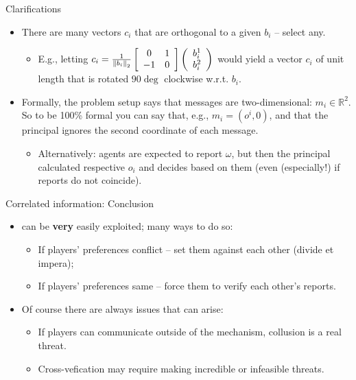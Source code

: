 \documentclass[english,10pt
,aspectratio=169
]{beamer}
\begin{document}
\begin{frame}{Clarifications}
	\begin{itemize}
		\item There are many vectors $c_i$ that are orthogonal to a given $b_i$ -- select any.
		\begin{itemize}
			\item E.g., letting $c_i = \frac{1}{\left\| b_i \right\|_2 } \left[ \begin{array}{c c} 0 & 1 \\ -1 & 0 \end{array} \right] \left( \begin{array}{c}
				b_i^1 \\ b_i^2
			\end{array} \right)$ would yield a vector $c_i$ of unit length that is rotated $90\deg$ clockwise w.r.t. $b_i$.
		\end{itemize}
		\item Formally, the problem setup says that messages are two-dimensional: $m_i \in \mathbb{R}^2$. So to be 100\% formal you can say that, e.g., $m_i = (o^i, 0)$, and that the principal ignores the second coordinate of each message.
		\begin{itemize}
			\item Alternatively: agents are expected to report $\omega$, but then the principal calculated respective $o_i$ and decides based on them (even (especially!) if reports do not coincide).
		\end{itemize}
	\end{itemize}
\end{frame}


\begin{frame}{Correlated information: Conclusion}
\begin{itemize}
	\item {} can be \alert{\textbf{very} easily exploited}; many ways to do so:
	\begin{itemize}
		\item If players' preferences conflict -- set them against each other (divide et impera);
		\item If players' preferences same -- force them to verify each other's reports.
	\end{itemize}
	\item Of course there are always issues that can arise:
	\begin{itemize}
		\item If players can communicate outside of the mechanism, collusion is a real threat.
		\item Cross-vefication may require making incredible or infeasible threats.
	\end{itemize}
\end{itemize}
\end{frame}


\end{document}
